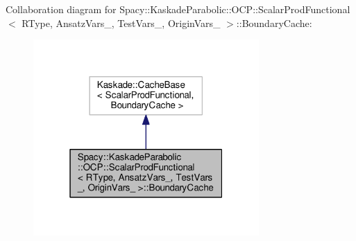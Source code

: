 Collaboration diagram for Spacy\-:\-:Kaskade\-Parabolic\-:\-:O\-C\-P\-:\-:Scalar\-Prod\-Functional$<$ R\-Type, Ansatz\-Vars\-\_\-, Test\-Vars\-\_\-, Origin\-Vars\-\_\- $>$\-:\-:Boundary\-Cache\-:
\nopagebreak
\begin{figure}[H]
\begin{center}
\leavevmode
\includegraphics[width=244pt]{classSpacy_1_1KaskadeParabolic_1_1OCP_1_1ScalarProdFunctional_1_1BoundaryCache__coll__graph}
\end{center}
\end{figure}
